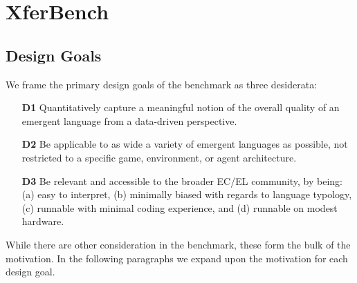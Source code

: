 \section{XferBench}


\subsection{Design Goals}
\unskip\label{sec:design}

We frame the primary design goals of the benchmark as three desiderata:
\begin{enumerate}[nosep]
  \item[\textbf{D1}] Quantitatively capture a meaningful notion of the overall quality\footnotemark{} of an emergent language from a data-driven perspective.
  \item[\textbf{D2}] Be applicable to as wide a variety of emergent languages as possible, not restricted to a specific game, environment, or agent architecture.
  \item[\textbf{D3}] Be relevant and accessible to the broader EC/EL community, by being:
    (a) easy to interpret,
    (b) minimally biased with regards to language typology,
    (c) runnable with minimal coding experience,
    and (d) runnable on modest hardware.
\end{enumerate}
While there are other consideration in the benchmark, these form the bulk of the motivation.
In the following paragraphs we expand upon the motivation for each design goal.

